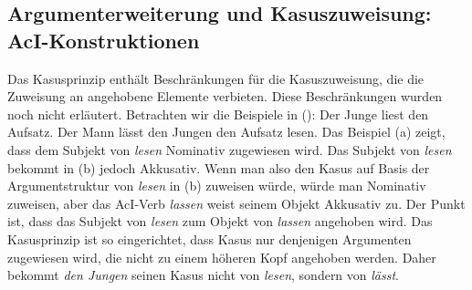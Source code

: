 



\subsection{Argumenterweiterung und Kasuszuweisung: AcI-Konstruktionen}

Das Kasusprinzip enthält Beschränkungen für die Kasuszuweisung, die die Zuweisung an
angehobene Elemente verbieten. Diese Beschränkungen wurden noch nicht erläutert. Betrachten wir die Beispiele in ():
\eal
\ex
Der Junge liest den Aufsatz.
\ex\label{ex-the-man-lets-the-boy-read-the-book}
Der Mann lässt den Jungen den Aufsatz lesen.
\zl
Das Beispiel (a) zeigt, dass dem Subjekt von \emph{lesen}
Nominativ zugewiesen wird. Das Subjekt von \emph{lesen} bekommt in (b) jedoch Akkusativ. Wenn
man also den Kasus auf Basis der Argumentstruktur von \emph{lesen} in (b) zuweisen würde, würde man
Nominativ zuweisen, aber das AcI-Verb \emph{lassen} weist seinem Objekt Akkusativ zu. Der
Punkt ist, dass das Subjekt von \emph{lesen} zum Objekt von \emph{lassen} angehoben wird. Das Kasusprinzip
ist so eingerichtet, dass Kasus nur denjenigen Argumenten zugewiesen wird, die nicht zu einem höheren Kopf angehoben werden. Daher bekommt \emph{den Jungen} seinen Kasus nicht von \emph{lesen}, sondern von \emph{lässt}.

